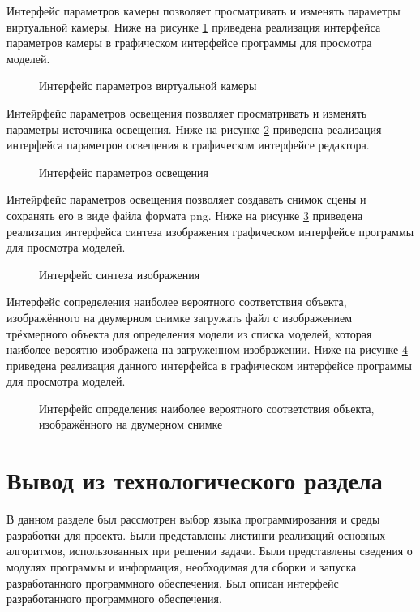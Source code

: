 Интерфейс параметров камеры позволяет просматривать и изменять параметры виртуальной камеры. Ниже на рисунке \ref{fig:model_params} приведена реализация интерфейса параметров камеры в графическом интерфейсе программы для просмотра моделей.
\begin{figure}[H]
	\caption{Интерфейс параметров виртуальной камеры}
	\label{fig:model_params}
\end{figure}

Интейрфейс параметров освещения позволяет просматривать и изменять параметры источника освещения. Ниже на рисунке \ref{fig:light_params} приведена реализация интерфейса параметров освещения в графическом интерфейсе редактора.
\begin{figure}[H]
	\caption{Интерфейс параметров освещения}
	\label{fig:light_params}
\end{figure}

Интейрфейс параметров освещения позволяет создавать снимок сцены и сохранять его в виде файла формата png. Ниже на рисунке \ref{fig:render_params} приведена реализация интерфейса синтеза изображения графическом интерфейсе программы для просмотра моделей.
\begin{figure}[H]
	\caption{Интерфейс синтеза изображения}
	\label{fig:render_params}
\end{figure}

Интерфейс сопределения наиболее вероятного соответствия объекта, изображённого на двумерном снимке загружать файл с изображением трёхмерного объекта для определения модели из списка моделей, которая наиболее вероятно изображена на загруженном изображении. Ниже на рисунке \ref{fig:recognize_params} приведена реализация данного интерфейса в графическом интерфейсе программы для просмотра моделей.
\begin{figure}[H]
	\caption{Интерфейс определения наиболее вероятного соответствия объекта, изображённого на двумерном снимке}
	\label{fig:recognize_params}
\end{figure}

\section{Вывод из технологического раздела}
В данном разделе был рассмотрен выбор языка программирования и среды разработки для проекта. Были представлены листинги реализаций основных алгоритмов, использованных при решении задачи. Были представлены сведения о модулях программы и информация, необходимая для сборки и запуска разработанного программного обеспечения. Был описан интерфейс разработанного программного обеспечения.